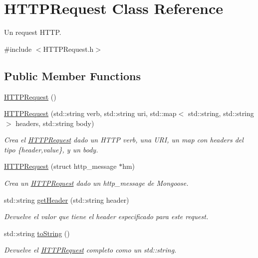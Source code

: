 \hypertarget{class_h_t_t_p_request}{}\section{H\+T\+T\+P\+Request Class Reference}
\label{class_h_t_t_p_request}


Un request H\+T\+T\+P.  




{\ttfamily \#include $<$H\+T\+T\+P\+Request.\+h$>$}

\subsection*{Public Member Functions}
\begin{DoxyCompactItemize}
\item 
\hyperlink{class_h_t_t_p_request_a7c53a92689eb5cee6b069a3db3c327ae}{H\+T\+T\+P\+Request} ()
\item 
\hyperlink{class_h_t_t_p_request_ae5880bda328e95165a150d5403a3cd22}{H\+T\+T\+P\+Request} (std\+::string verb, std\+::string uri, std\+::map$<$ std\+::string, std\+::string $>$ headers, std\+::string body)
\begin{DoxyCompactList}\small\item\em Crea el \hyperlink{class_h_t_t_p_request}{H\+T\+T\+P\+Request} dado un H\+T\+T\+P verb, una U\+R\+I, un map con headers del tipo \{header,value\}, y un body. \end{DoxyCompactList}\item 
\hyperlink{class_h_t_t_p_request_af30941e3edf4dd0534ccee922b80d214}{H\+T\+T\+P\+Request} (struct http\+\_\+message $\ast$hm)
\begin{DoxyCompactList}\small\item\em Crea un \hyperlink{class_h_t_t_p_request}{H\+T\+T\+P\+Request} dado un http\+\_\+message de Mongoose. \end{DoxyCompactList}\item 
std\+::string \hyperlink{class_h_t_t_p_request_a1d399357b19166c7b4c624bbd73365c6}{get\+Header} (std\+::string header)
\begin{DoxyCompactList}\small\item\em Devuelve el valor que tiene el header especificado para este request. \end{DoxyCompactList}\item 
std\+::string \hyperlink{class_h_t_t_p_request_a0905012de141cce7785b33c8d10623c8}{to\+String} ()
\begin{DoxyCompactList}\small\item\em Devuelve el \hyperlink{class_h_t_t_p_request}{H\+T\+T\+P\+Request} completo como un std\+::string. \end{DoxyCompactList}\item 

\end{DoxyCompactItemize}
